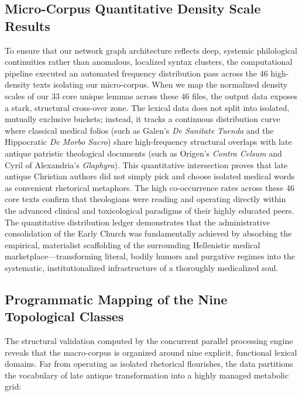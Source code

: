 \documentclass[11pt,twoside,a4paper]{article}
\begin{document}
\subsection{Micro-Corpus Quantitative Density Scale Results}
To ensure that our network graph architecture reflects deep, systemic philological continuities rather than anomalous, localized syntax clusters, the computational pipeline executed an automated frequency distribution pass across the 46 high-density texts isolating our micro-corpus. When we map the normalized density scales of our 33 core unique lemmas across these 46 files, the output data exposes a stark, structural cross-over zone. The lexical data does not split into isolated, mutually exclusive buckets; instead, it tracks a continuous distribution curve where classical medical folios (such as Galen's \textit{De Sanitate Tuenda} and the Hippocratic \textit{De Morbo Sacro}) share high-frequency structural overlaps with late antique patristic theological documents (such as Origen's \textit{Contra Celsum} and Cyril of Alexandria's \textit{Glaphyra}).
This quantitative intersection proves that late antique Christian authors did not simply pick and choose isolated medical words as convenient rhetorical metaphors. The high co-occurrence rates across these 46 core texts confirm that theologians were reading and operating directly within the advanced clinical and toxicological paradigms of their highly educated peers. The quantitative distribution ledger demonstrates that the administrative consolidation of the Early Church was fundamentally achieved by absorbing the empirical, materialist scaffolding of the surrounding Hellenistic medical marketplace—transforming literal, bodily humors and purgative regimes into the systematic, institutionalized infrastructure of a thoroughly medicalized soul.

\subsection{Programmatic Mapping of the Nine Topological Classes}
The structural validation computed by the concurrent parallel processing engine reveals that the macro-corpus is organized around nine explicit, functional lexical domains. Far from operating as isolated rhetorical flourishes, the data partitions the vocabulary of late antique transformation into a highly managed metabolic grid:
\end{document}
